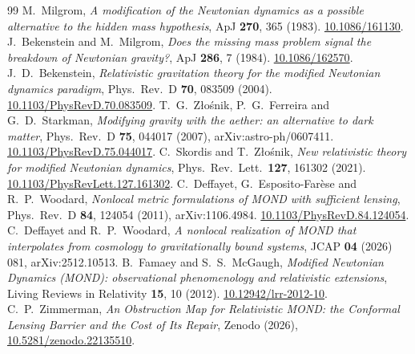 \documentclass[11pt,letterpaper]{article}
\begin{document}
\begin{thebibliography}{99}
 M.\ Milgrom, \emph{A modification of the Newtonian dynamics as a possible alternative to the hidden mass hypothesis}, ApJ \textbf{270}, 365 (1983). \href{https://doi.org/10.1086/161130}{10.1086/161130}.
 J.\ Bekenstein and M.\ Milgrom, \emph{Does the missing mass problem signal the breakdown of Newtonian gravity?}, ApJ \textbf{286}, 7 (1984). \href{https://doi.org/10.1086/162570}{10.1086/162570}.
 J.\ D.\ Bekenstein, \emph{Relativistic gravitation theory for the modified Newtonian dynamics paradigm}, Phys.\ Rev.\ D \textbf{70}, 083509 (2004). \href{https://doi.org/10.1103/PhysRevD.70.083509}{10.1103/PhysRevD.70.083509}.
 T.\ G.\ Z\l{}o\'snik, P.\ G.\ Ferreira and G.\ D.\ Starkman, \emph{Modifying gravity with the aether: an alternative to dark matter}, Phys.\ Rev.\ D \textbf{75}, 044017 (2007), arXiv:astro-ph/0607411. \href{https://doi.org/10.1103/PhysRevD.75.044017}{10.1103/PhysRevD.75.044017}.
 C.\ Skordis and T.\ Z\l{}o\'snik, \emph{New relativistic theory for modified Newtonian dynamics}, Phys.\ Rev.\ Lett.\ \textbf{127}, 161302 (2021). \href{https://doi.org/10.1103/PhysRevLett.127.161302}{10.1103/PhysRevLett.127.161302}.
 C.\ Deffayet, G.\ Esposito-Far\`ese and R.\ P.\ Woodard, \emph{Nonlocal metric formulations of MOND with sufficient lensing}, Phys.\ Rev.\ D \textbf{84}, 124054 (2011), arXiv:1106.4984. \href{https://doi.org/10.1103/PhysRevD.84.124054}{10.1103/PhysRevD.84.124054}.
 C.\ Deffayet and R.\ P.\ Woodard, \emph{A nonlocal realization of MOND that interpolates from cosmology to gravitationally bound systems}, JCAP \textbf{04} (2026) 081, arXiv:2512.10513.
 B.\ Famaey and S.\ S.\ McGaugh, \emph{Modified Newtonian Dynamics (MOND): observational phenomenology and relativistic extensions}, Living Reviews in Relativity \textbf{15}, 10 (2012). \href{https://doi.org/10.12942/lrr-2012-10}{10.12942/lrr-2012-10}.
 C.\ P.\ Zimmerman, \emph{An Obstruction Map for Relativistic MOND: the Conformal Lensing Barrier and the Cost of Its Repair}, Zenodo (2026), \href{https://doi.org/10.5281/zenodo.22135510}{10.5281/zenodo.22135510}.

\end{thebibliography}
\end{document}
